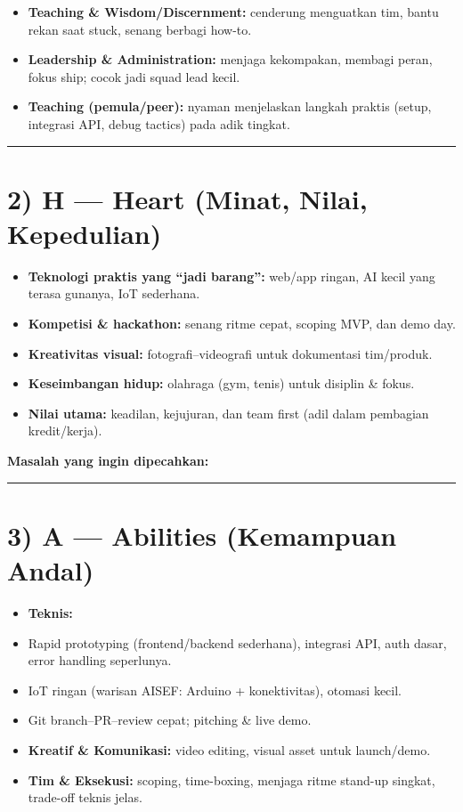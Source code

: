 \documentclass[
  letterpaper,
  DIV=11,
  numbers=noendperiod]{scrreprt}
\providecommand{\tightlist}{%
  \setlength{\itemsep}{0pt}\setlength{\parskip}{0pt}}
\begin{document}
\begin{itemize}
\tightlist
\item
  \textbf{Teaching \& Wisdom/Discernment:} cenderung menguatkan tim,
  bantu rekan saat stuck, senang berbagi how-to.
\item
  \textbf{Leadership \& Administration:} menjaga kekompakan, membagi
  peran, fokus ship; cocok jadi squad lead kecil.
\item
  \textbf{Teaching (pemula/peer):} nyaman menjelaskan langkah praktis
  (setup, integrasi API, debug tactics) pada adik tingkat.
\end{itemize}

\begin{center}\rule{0.5\linewidth}{0.5pt}\end{center}

\section{2) H --- Heart (Minat, Nilai,
Kepedulian)}\label{h-heart-minat-nilai-kepedulian}

\begin{itemize}
\item
  \textbf{Teknologi praktis yang ``jadi barang'':} web/app ringan, AI
  kecil yang terasa gunanya, IoT sederhana.
\item
  \textbf{Kompetisi \& hackathon:} senang ritme cepat, scoping MVP, dan
  demo day.
\item
  \textbf{Kreativitas visual:} fotografi--videografi untuk dokumentasi
  tim/produk.
\item
  \textbf{Keseimbangan hidup:} olahraga (gym, tenis) untuk disiplin \&
  fokus.
\item
  \textbf{Nilai utama:} keadilan, kejujuran, dan team first (adil dalam
  pembagian kredit/kerja).
\end{itemize}

\textbf{Masalah yang ingin dipecahkan:}

\begin{center}\rule{0.5\linewidth}{0.5pt}\end{center}

\section{3) A --- Abilities (Kemampuan
Andal)}\label{a-abilities-kemampuan-andal}

\begin{itemize}
\item
  \textbf{Teknis:}
\item
  Rapid prototyping (frontend/backend sederhana), integrasi API, auth
  dasar, error handling seperlunya.
\item
  IoT ringan (warisan AISEF: Arduino + konektivitas), otomasi kecil.
\item
  Git branch--PR--review cepat; pitching \& live demo.
\item
  \textbf{Kreatif \& Komunikasi:} video editing, visual asset untuk
  launch/demo.
\item
  \textbf{Tim \& Eksekusi:} scoping, time-boxing, menjaga ritme stand-up
  singkat, trade-off teknis jelas.
\end{itemize}
\end{document}
